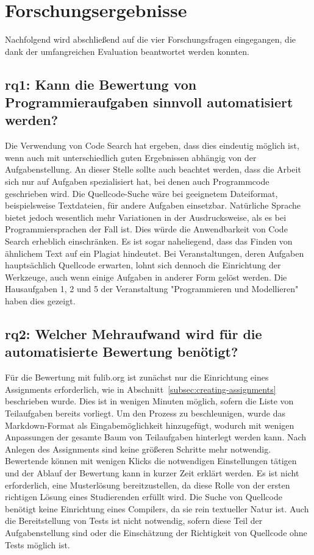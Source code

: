 \section{Forschungsergebnisse}\label{sec:research-results}

Nachfolgend wird abschließend auf die vier Forschungsfragen eingegangen, die dank der umfangreichen Evaluation beantwortet werden konnten.

\subsection[\acs{rq}1]{\ac{rq}1: Kann die Bewertung von Programmieraufgaben sinnvoll automatisiert werden?}\label{subsec:ra1-useful-automation}

Die Verwendung von Code Search hat ergeben, dass dies eindeutig möglich ist, wenn auch mit unterschiedlich guten Ergebnissen abhängig von der Aufgabenstellung.
An dieser Stelle sollte auch beachtet werden, dass die Arbeit sich nur auf Aufgaben spezialisiert hat, bei denen auch Programmcode geschrieben wird.
Die Quellcode-Suche wäre bei geeignetem Dateiformat, beispielsweise Textdateien, für andere Aufgaben einsetzbar.
Natürliche Sprache bietet jedoch wesentlich mehr Variationen in der Ausdrucksweise, als es bei Programmiersprachen der Fall ist.
Dies würde die Anwendbarkeit von Code Search erheblich einschränken.
Es ist sogar naheliegend, dass das Finden von ähnlichem Text auf ein Plagiat hindeutet.
Bei Veranstaltungen, deren Aufgaben hauptsächlich Quellcode erwarten, lohnt sich dennoch die Einrichtung der Werkzeuge, auch wenn einige Aufgaben in anderer Form gelöst werden.
Die Hausaufgaben 1, 2 und 5 der Veranstaltung "Programmieren und Modellieren" haben dies gezeigt.

\subsection[\acs{rq}2]{\ac{rq}2: Welcher Mehraufwand wird für die automatisierte Bewertung benötigt?}\label{subsec:ra2-additional-effort}

Für die Bewertung mit fulib.org ist zunächst nur die Einrichtung eines Assignments erforderlich, wie in Abschnitt~\ref{subsec:creating-assignments} beschrieben wurde.
Dies ist in wenigen Minuten möglich, sofern die Liste von Teilaufgaben bereits vorliegt.
Um den Prozess zu beschleunigen, wurde das Markdown-Format als Eingabemöglichkeit hinzugefügt, wodurch mit wenigen Anpassungen der gesamte Baum von Teilaufgaben hinterlegt werden kann.
Nach Anlegen des Assignments sind keine größeren Schritte mehr notwendig.
Bewertende können mit wenigen Klicks die notwendigen Einstellungen tätigen und der Ablauf der Bewertung kann in kurzer Zeit erklärt werden.
Es ist nicht erforderlich, eine Musterlösung bereitzustellen, da diese Rolle von der ersten richtigen Lösung eines Studierenden erfüllt wird.
Die Suche von Quellcode benötigt keine Einrichtung eines Compilers, da sie rein textueller Natur ist.
Auch die Bereitstellung von Tests ist nicht notwendig, sofern diese Teil der Aufgabenstellung sind oder die Einschätzung der Richtigkeit von Quellcode ohne Tests möglich ist.

